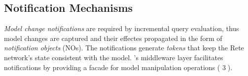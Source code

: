 




\subsection{Notification Mechanisms}
\label{notifications}

\emph{Model change notifications} are required by incremental query evaluation, thus model changes are captured and their effectes propagated in the form of \emph{notification objects} (NOs). The notifications generate \emph{tokens} that keep the Rete network's state consistent with the model. \iqd{}'s middleware layer facilitates notifications by providing a facade for model manipulation operations ( \textcircled{3}).


